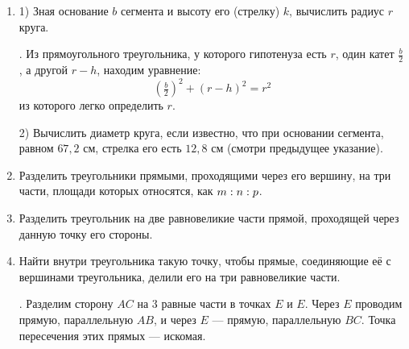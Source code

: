 {\begin{enumerate}
2) площадь $p_2\approx \tfrac23 bh=\tfrac23\cdot r\cdot 0{,}1340\cdot r=0{,}0893\cdot r^2$;

3) площадь $p_3\approx \tfrac23 bh+\frac{h^3}{2b}=0{,}0893r^2+0{,}0012r^2=0{,}0905\cdot r^2$.

Абсолютная погрешность.
\[\text{для площади}~p_2 \approx 0{,}0906\cdot r^2 - 0{,}0893\cdot r^2 = 0{,}0013\cdot r^2;\]
\[\text{для площади}~p_3 \approx 0{,}0906\cdot r^2 - 0{,}0905\cdot r^2 = 0{,}0001\cdot r^2.\]
Относительная погрешность (то есть отношение абсолютной погрешности к измеряемой величине):
\[\text{для площади}~p_2 = \frac{p_1-p_2}{p_1}\approx\frac{0{,}0013r^2}{0{,}0906r^2}\approx0{,}014 = 1{,}4\%;\]
\[\text{для площади}~p_3 = \frac{p_1-p_3}{p_1}\approx\frac{0{,}0001r^2}{0{,}0906r^2}\approx0{,}001 = 0{,}1\%;\]
Таким образом, результат, вычисленный по первой приближённой формуле, меньше истинного результата (приблизительно) на $1{,}4\%$, а результат, вычисленный по второй приближённой формуле, меньше истинного на $0{,}1\%$.

\item
1) Зная основание $b$ сегмента и высоту его (стрелку) $k$, вычислить радиус $r$ круга.

\smallskip
{}.
Из прямоугольного треугольника, у которого гипотенуза есть $r$, один катет $\frac b2$, а другой $r-h$, находим уравнение:
\[(\tfrac b2)^2+(r-h)^2=r^2\]
из которого легко определить $r$.

2) Вычислить диаметр круга, если известно, что при основании сегмента, равном $67{,}2$ см, стрелка его есть $12{,}8$ см (смотри предыдущее указание).

\smallskip
{}

\item
Разделить треугольники прямыми, проходящими через его вершину, на три части, площади которых относятся, как $m\z:n:p$.

\item
Разделить треугольник на две равновеликие части прямой, проходящей через данную точку его стороны.

\item
Найти внутри треугольника такую точку, чтобы прямые, соединяющие её с вершинами треугольника, делили его на три равновеликие части.

\smallskip
{}.
Разделим сторону $AC$ на $3$ равные части в точках $E$ и $E$.
Через $E$ проводим прямую, параллельную $AB$, и через $E$ — прямую, параллельную $BC$.
Точка пересечения этих прямых — искомая.


\end{enumerate}}
